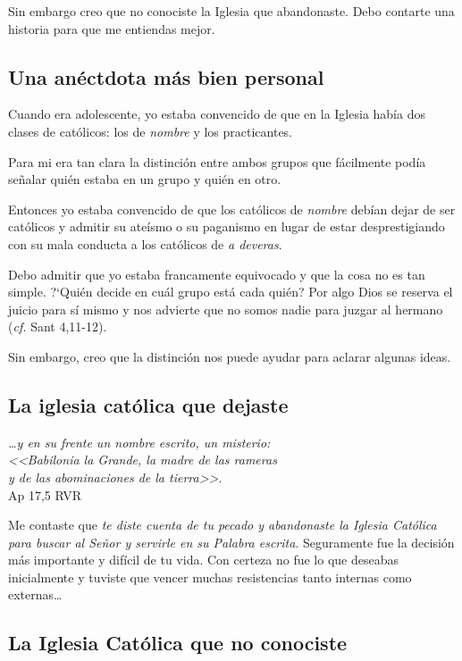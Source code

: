 \documentclass{article}
\begin{document}
Sin embargo creo que no conociste la Iglesia que abandonaste. Debo contarte una historia para que me entiendas mejor.

\subsection{Una an\'ectdota m\'as bien personal}

Cuando era adolescente, yo estaba convencido de que en la Iglesia hab\'{i}a dos clases de cat\'olicos: los de \emph{nombre} y los practicantes.

Para mi era tan clara la distinci\'on entre ambos grupos que f\'acilmente pod\'{i}a se\~nalar qui\'en estaba en un grupo y qui\'en en otro.

Entonces yo estaba convencido de que los cat\'olicos de \emph{nombre} deb\'{i}an dejar de ser cat\'olicos y admitir su ate\'{i}smo o su paganismo en lugar de estar desprestigiando con su mala conducta a los cat\'olicos de \emph{a deveras}.

Debo admitir que yo estaba francamente equivocado y que la cosa no es tan simple. ?`Qui\'en decide en cu\'al grupo est\'a cada qui\'en? Por algo Dios se reserva el juicio para s\'{i} mismo y nos advierte que no somos nadie para juzgar al hermano (\emph{cf.} Sant 4,11-12).

Sin embargo, creo que la distinci\'on nos puede ayudar para aclarar algunas ideas.

\subsection{La iglesia cat\'olica que dejaste}

\begin{flushright}
\emph{{\ldots}y en su frente un nombre escrito, un misterio:\\
<<Babilonia la Grande, la madre de las rameras\\
y de las abominaciones de la tierra>>}.\\
Ap 17,5 RVR
\end{flushright}

\noindent
Me contaste que \emph{te diste cuenta de tu pecado y abandonaste la Iglesia Cat\'olica para buscar al Se\~nor y servirle en su Palabra escrita}. Seguramente fue la decisi\'on m\'as importante y dif\'{i}cil de tu vida. Con certeza no fue lo que deseabas inicialmente y tuviste que vencer muchas resistencias tanto internas como externas\ldots

\subsection{La Iglesia Cat\'olica que no conociste}
\end{document}
